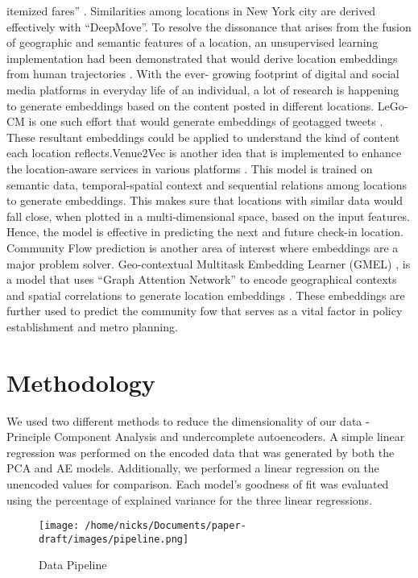 \documentclass{article}
\begin{document}
itemized fares” \parencite{DeepMove}. Similarities among locations in New York city are 
derived effectively with “DeepMove”. To resolve the dissonance that arises from the 
fusion of geographic and semantic features of a location, an unsupervised learning 
implementation had been demonstrated that would derive location embeddings from human 
trajectories \parencite{DisentangledLocationEmbeddings}. With the ever- growing 
footprint of digital and social media platforms in everyday life of an individual, a
lot of research is happening to generate embeddings based on the content posted in 
different locations. LeGo-CM is one such effort that would generate embeddings of 
geotagged tweets \parencite{GeotaggedTweets}. These resultant embeddings could be 
applied to understand the kind of content each location reflects.Venue2Vec is another 
idea that is implemented to enhance the location-aware services in various platforms 
\parencite{Venue2Vec}. This model is trained on semantic data, temporal-spatial context 
and sequential relations among locations to generate embeddings. This makes sure that 
locations with similar data would fall close, when plotted in a multi-dimensional space,
based on the input features. Hence, the model is effective in predicting the next and  
future check-in location. Community Flow prediction is another area of interest where
embeddings are a major problem solver. Geo-contextual Multitask Embedding Learner (GMEL)
, is a model that uses “Graph Attention Network” to encode geographical contexts and 
spatial correlations to generate location embeddings \parencite{CommutingFlowPrediction}.
These embeddings are further used to predict the community fow that serves as a vital
factor in policy establishment and metro planning.


\section{Methodology}

We used two different methods to reduce the dimensionality of our data - Principle Component
Analysis and undercomplete autoencoders. A simple linear regression was performed on 
the encoded data that was generated by both the PCA and AE models. Additionally, we performed
a linear regression on the unencoded values for comparison. Each model's goodness of fit
was evaluated using the percentage of explained variance for the three linear regressions. 

\begin{figure}[h]
\texttt{[image: /home/nicks/Documents/paper-draft/images/pipeline.png]}
\caption{Data Pipeline}
\label{fig:pipeline}
\end{figure}
\end{document}
